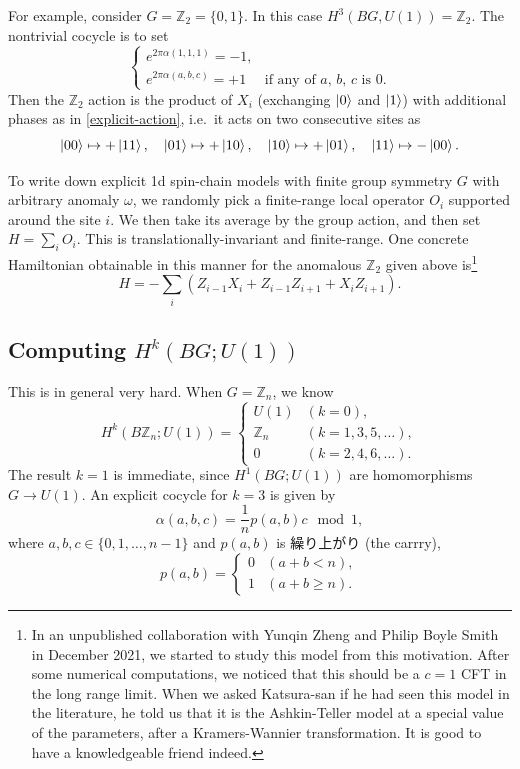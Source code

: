\documentclass[12pt]{article}
\numberwithin{equation}{section}
\numberwithin{figure}{section}
\theoremstyle{remark}
\def\bZ{\mathbb{Z}}
\begin{document}
For example, consider $G=\bZ_2=\{0,1\}$. In this case $H^3(BG,U(1))=\bZ_2$.
The nontrivial cocycle is to set
\begin{equation}
\begin{cases}
e^{2\pi \alpha(1,1,1)}=-1, & \\
e^{2\pi \alpha(a,b,c)}=+1 & \text{if any of $a$, $b$, $c$ is 0}.
\end{cases}
\end{equation}
Then the $\bZ_2$ action is the product of $X_i$ (exchanging $\ket0$ and $\ket1$)
with additional phases as in \eqref{explicit-action}, i.e.~it acts on two consecutive sites as \begin{equation}
\ket{00} \mapsto +\ket{11}, \quad
\ket{01} \mapsto +\ket{10}, \quad
\ket{10} \mapsto +\ket{01}, \quad
\ket{11} \mapsto -\ket{00}.
\end{equation}

To write down explicit 1d spin-chain models
with finite group symmetry $G$ with arbitrary anomaly $\omega$,
we randomly pick a finite-range local operator $O_i$ supported around the site $i$.
We then take its average by the group action,
and then set $H=\sum_i O_i$.
This  is translationally-invariant and finite-range.
One concrete Hamiltonian obtainable in this manner for the anomalous $\bZ_2$ given above 
is\footnote{%
In an unpublished collaboration with Yunqin Zheng and Philip Boyle Smith in December 2021,
we started to study this model from this motivation.
After some numerical computations, we noticed that this should be a $c=1$ CFT in the long range limit.
When we asked Katsura-san if he had seen this model in the literature,
he told us that it is the Ashkin-Teller model at a special value of the parameters,
after a Kramers-Wannier transformation.
It is good to have a knowledgeable friend indeed.
} \begin{equation}
H=-\sum_i (Z_{i-1} X_i + Z_{i-1} Z_{i+1} + X_i Z_{i+1} ).
\end{equation} 

\subsection{Computing $H^k(BG;U(1))$}
This is in general very hard. 
When $G=\bZ_n$, we know \begin{equation}
H^k(B\bZ_n;U(1))=\begin{cases}
U(1) & (k=0),\\
\bZ_n & (k=1,3,5,\ldots),\\
0 & (k=2,4,6,\ldots).
\end{cases}
\end{equation} 
The result $k=1$ is immediate, since $H^1(BG;U(1))$ are homomorphisms $G\to U(1)$.
An explicit cocycle for $k=3$ is given by \begin{equation}
\alpha(a,b,c)= \frac{1}n p(a,b) c \mod 1,
\end{equation} where $a,b,c\in \{0,1,\ldots, n-1\}$ and $p(a,b)$ is 繰り上がり (the carrry), \begin{equation}
p(a,b)=\begin{cases}
0 & (a+b < n),\\
1 & (a+b \ge n).
\end{cases}
\end{equation}
\end{document}
